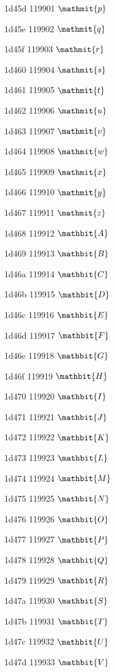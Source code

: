 \documentclass[11pt]{article}
\begin{document}
1d45d 119901 \ensuremath{\mathmit{p}}

1d45e 119902 \ensuremath{\mathmit{q}}

1d45f 119903 \ensuremath{\mathmit{r}}

1d460 119904 \ensuremath{\mathmit{s}}

1d461 119905 \ensuremath{\mathmit{t}}

1d462 119906 \ensuremath{\mathmit{u}}

1d463 119907 \ensuremath{\mathmit{v}}

1d464 119908 \ensuremath{\mathmit{w}}

1d465 119909 \ensuremath{\mathmit{x}}

1d466 119910 \ensuremath{\mathmit{y}}

1d467 119911 \ensuremath{\mathmit{z}}

1d468 119912 \ensuremath{\mathbit{A}}

1d469 119913 \ensuremath{\mathbit{B}}

1d46a 119914 \ensuremath{\mathbit{C}}

1d46b 119915 \ensuremath{\mathbit{D}}

1d46c 119916 \ensuremath{\mathbit{E}}

1d46d 119917 \ensuremath{\mathbit{F}}

1d46e 119918 \ensuremath{\mathbit{G}}

1d46f 119919 \ensuremath{\mathbit{H}}

1d470 119920 \ensuremath{\mathbit{I}}

1d471 119921 \ensuremath{\mathbit{J}}

1d472 119922 \ensuremath{\mathbit{K}}

1d473 119923 \ensuremath{\mathbit{L}}

1d474 119924 \ensuremath{\mathbit{M}}

1d475 119925 \ensuremath{\mathbit{N}}

1d476 119926 \ensuremath{\mathbit{O}}

1d477 119927 \ensuremath{\mathbit{P}}

1d478 119928 \ensuremath{\mathbit{Q}}

1d479 119929 \ensuremath{\mathbit{R}}

1d47a 119930 \ensuremath{\mathbit{S}}

1d47b 119931 \ensuremath{\mathbit{T}}

1d47c 119932 \ensuremath{\mathbit{U}}

1d47d 119933 \ensuremath{\mathbit{V}}
\end{document}
